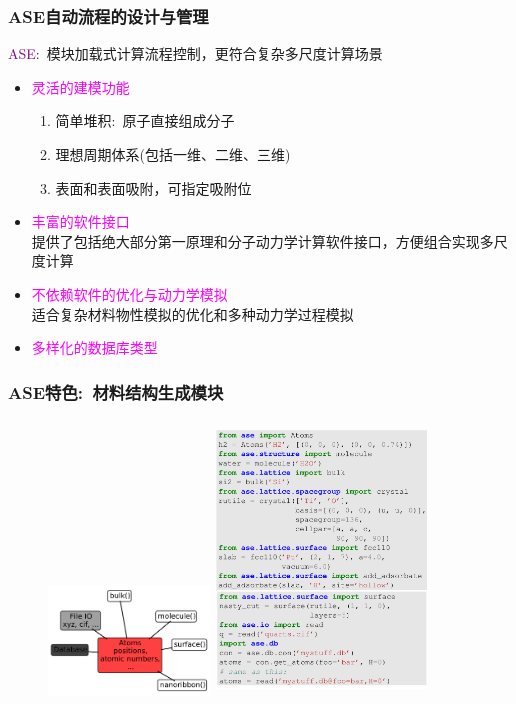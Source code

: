 \documentclass[cjk,slidestop,compress,mathserif,blue]{beamer}
\begin{document}
\frame
{
	\frametitle{\textrm{ASE}自动流程的设计与管理}
		\textcolor{purple}{\textrm{ASE}}:~模块加载式计算流程控制，更符合复杂多尺度计算场景
		\begin{itemize}
			\item \textcolor{magenta}{灵活的建模功能}
				\begin{enumerate}
    \setlength{\itemsep}{10pt}
					\item 简单堆积:~原子直接组成分子
					\item 理想周期体系(包括一维、二维、三维)
					\item 表面和表面吸附，可指定吸附位
				\end{enumerate}
			\item \textcolor{magenta}{丰富的软件接口}\\
				提供了包括绝大部分第一原理和分子动力学计算软件接口，方便组合实现多尺度计算
			\item \textcolor{magenta}{不依赖软件的优化与动力学模拟}\\
				适合复杂材料物性模拟的优化和多种动力学过程模拟
			\item \textcolor{magenta}{多样化的数据库类型}
		\end{itemize} 
}

\frame
{
\frametitle{\textrm{ASE}特色:~材料结构生成模块}
\begin{figure}[h!]
\centering
\vspace*{-0.15in}
\includegraphics[height=1.2in,width=1.7in,viewport=0 0 820 530,clip]{Figures/ASE_atoms_module.png}
\includegraphics[height=2.9in,width=2.2in,viewport=0 0 970 1200,clip]{Figures/ASE_atoms_module-examples.png}
\label{Logo_atoms-module}
\end{figure} 
}
\end{document}
